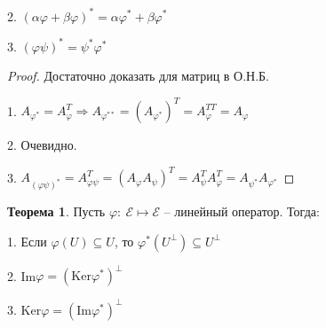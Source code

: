 \documentclass[a4paper, 12pt]{article}
\theoremstyle{definition}
\newtheorem*{theorem}{Теорема}
\begin{document}
    2. $(\alpha \varphi + \beta \varphi)^* = \alpha \varphi^*
    + \beta \varphi^*$
    
    3. $(\varphi \psi)^* = \psi^* \varphi^*$ 
    \begin{proof}
        Достаточно доказать для матриц в О.Н.Б.

        1. $A_{\varphi^*} = A_\varphi^T \Longrightarrow 
        A_{\varphi^{**}} = (A_{\varphi^*})^T = A_\varphi^{TT} = 
        A_\varphi$ 

        2. Очевидно.

        3. $A_{(\varphi \psi)^*} = A_{\varphi \psi}^T = 
        (A_\varphi A_\psi)^T = 
        A_\psi^T A_\varphi^T = A_{\psi^*}A_{\varphi^*}$ 
    \end{proof}

    \begin{theorem}
        Пусть $\varphi:\ \mathcal{E} \longmapsto \mathcal{E}$
        -- линейный оператор. Тогда:
        
        1.  Если $\varphi(U) \subseteq U$, то $\varphi^*
        (U^\perp) \subseteq U^\perp$

        2. Im$\varphi = (\text{Ker}\varphi^*)^\perp$
        
        3. $\text{Ker}\varphi = (\text{Im}\varphi^*)^\perp$ 
    \end{theorem}
\end{document}

